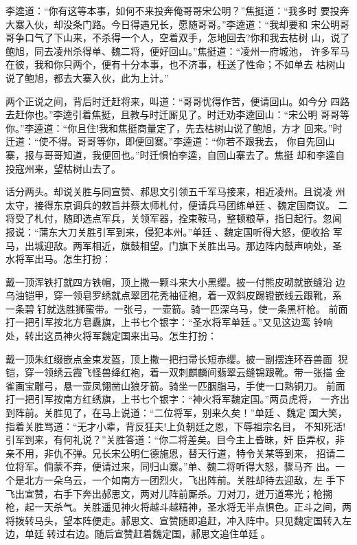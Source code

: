 李逵道：“你有这等本事，如何不来投奔俺哥哥宋公明？”焦挺道：“我多时
要投奔大寨入伙，却没条门路。今日得遇兄长，愿随哥哥。”李逵道：“我却要和
宋公明哥哥争口气了下山来，不杀得一个人，空着双手，怎地回去?你和我去枯树
山，说了鲍旭，同去凌州杀得单、魏二将，便好回山。”焦挺道：“凌州一府城池，
许多军马在彼，我和你只两个，便有十分本事，也不济事，枉送了性命；不如单去
枯树山说了鲍旭，都去大寨入伙，此为上计。”

两个正说之间，背后时迁赶将来，叫道：“哥哥忧得作苦，便请回山。如今分
四路去赶你也。”李逵引着焦挺，且教与时迁厮见了。时迁劝李逵回山：“宋公明
哥哥等你。”李逵道：“你且住!我和焦挺商量定了，先去枯树山说了鲍旭，方才
回来。”时迁道：“使不得。哥哥等你，即便回寨。”李逵道：“你若不跟我去，
你自先回山寨，报与哥哥知道，我便回也。”时迁惧怕李逵，自回山寨去了。焦挺
却和李逵自投寇州来，望枯树山去了。

话分两头。却说关胜与同宣赞、郝思文引领五千军马接来，相近凌州。且说凌
州太守，接得东京调兵的敕旨并蔡太师札付，便请兵马团练单廷、魏定国商议。
二将受了札付，随即选点军兵，关领军器，拴束鞍马，整顿粮草，指日起行。忽闻
报说：“蒲东大刀关胜引军到来，侵犯本州。”单廷、魏定国听得大怒，便收拾
军马，出城迎敌。两军相近，旗鼓相望。门旗下关胜出马。那边阵内鼓声响处，圣
水将军出马。怎生打扮：

戴一顶浑铁打就四方铁帽，顶上撒一颗斗来大小黑缨。披一付熊皮砌就嵌缝沿
边乌油铠甲，穿一领皂罗绣就点翠团花秃袖征袍，着一双斜皮踢镫嵌线云跟靴，系
一条碧钉就迭胜狮蛮带。一张弓，一壶箭。骑一匹深乌马，使一条黑杆枪。
前面打一把引军按北方皂纛旗，上书七个银字：“圣水将军单廷。”又见这边鸾
铃响处，转出这员神火将军魏定国来出马。怎生打扮：

戴一顶朱红缀嵌点金束发盔，顶上撒一把扫帚长短赤缨。披一副摆连环吞兽面
猊铠，穿一领绣云霞飞怪兽绛红袍，着一双刺麒麟间翡翠云缝锦跟靴。带一张描
金雀画宝雕弓，悬一壶凤翎凿山狼牙箭。骑坐一匹胭脂马，手使一口熟铜刀。
前面打一把引军按南方红绣旗，上书七个银字：“神火将军魏定国。”两员虎将，
一齐出到阵前。关胜见了，在马上说道：“二位将军，别来久矣！”单廷、魏定
国大笑，指着关胜骂道：“无才小辈，背反狂夫!上负朝廷之恩，下辱祖宗名目，
不知死活!引军到来，有何礼说？”关胜答道：“你二将差矣。目今主上昏昧，奸
臣弄权，非亲不用，非仇不弹。兄长宋公明仁德施恩，替天行道，特令关某等到来，
招请二位将军。倘蒙不弃，便请过来，同归山寨。”单、魏二将听得大怒，骤马齐
出。一个是北方一朵乌云，一个如南方一团烈火，飞出阵前。关胜却待去迎敌，左
手下飞出宣赞，右手下奔出郝思文，两对儿阵前厮杀。刀对刀，迸万道寒光；枪搠
枪，起一天杀气。关胜遥见神火将越斗越精神，圣水将无半点惧色。正斗之间，两
将拨转马头，望本阵便走。郝思文、宣赞随即追赶，冲入阵中。只见魏定国转入左
边，单廷转过右边。随后宣赞赶着魏定国，郝思文追住单廷。

